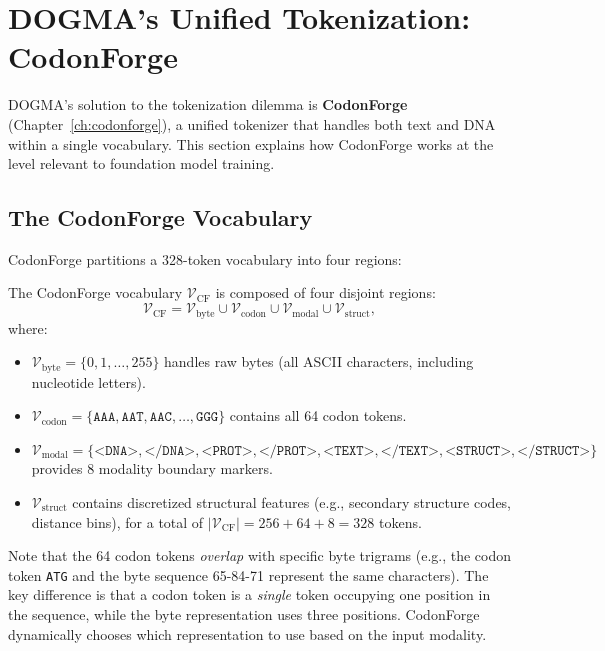 \section{DOGMA's Unified Tokenization: CodonForge}
\label{sec:codonforge-unified}

DOGMA's solution to the tokenization dilemma is \textbf{CodonForge} (Chapter~\ref{ch:codonforge}), a unified tokenizer that handles both text and DNA within a single vocabulary. This section explains how CodonForge works at the level relevant to foundation model training.

\subsection{The CodonForge Vocabulary}

CodonForge partitions a 328-token vocabulary into four regions:

\begin{dogmadef}
The CodonForge vocabulary $\mathcal{V}_{\mathrm{CF}}$ is composed of four disjoint regions:
\begin{equation}
\mathcal{V}_{\mathrm{CF}} = \mathcal{V}_{\text{byte}} \cup \mathcal{V}_{\text{codon}} \cup \mathcal{V}_{\text{modal}} \cup \mathcal{V}_{\text{struct}},
\end{equation}
where:
\begin{itemize}[leftmargin=1.5em]
  \item $\mathcal{V}_{\text{byte}} = \{0, 1, \ldots, 255\}$ handles raw bytes (all ASCII characters, including nucleotide letters).
  \item $\mathcal{V}_{\text{codon}} = \{\texttt{AAA}, \texttt{AAT}, \texttt{AAC}, \ldots, \texttt{GGG}\}$ contains all 64 codon tokens.
  \item $\mathcal{V}_{\text{modal}} = \{\texttt{<DNA>}, \texttt{</DNA>}, \texttt{<PROT>}, \texttt{</PROT>}, \texttt{<TEXT>}, \texttt{</TEXT>}, \texttt{<STRUCT>}, \texttt{</STRUCT>}\}$ provides 8 modality boundary markers.
  \item $\mathcal{V}_{\text{struct}}$ contains discretized structural features (e.g., secondary structure codes, distance bins), for a total of $|\mathcal{V}_{\mathrm{CF}}| = 256 + 64 + 8 = 328$ tokens.
\end{itemize}
\end{dogmadef}

Note that the 64 codon tokens \emph{overlap} with specific byte trigrams (e.g., the codon token \texttt{ATG} and the byte sequence 65-84-71 represent the same characters). The key difference is that a codon token is a \emph{single} token occupying one position in the sequence, while the byte representation uses three positions. CodonForge dynamically chooses which representation to use based on the input modality.

